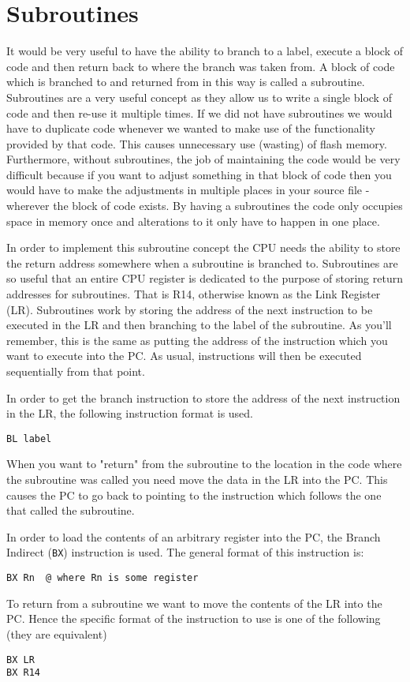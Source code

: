 \chapter{Subroutines}
It would be very useful to have the ability to branch to a label, execute a block of code and then return back to where the branch was taken from. A block of code which is branched to and returned from in this way is called a subroutine.
Subroutines are a very useful concept as they allow us to write a single block of code and then re-use it multiple times. 
If we did not have subroutines we would have to duplicate code whenever we wanted to make use of the functionality provided by that code.
This causes unnecessary use (wasting) of flash memory.
Furthermore, without subroutines, the job of maintaining the code would be very difficult because if you want to adjust something in that block of code then you would have to make the adjustments in multiple places in your source file - wherever the block of code exists.
By having a subroutines the code only occupies space in memory once and alterations to it only have to happen in one place.

In order to implement this subroutine concept the CPU needs the ability to store the return address somewhere when a subroutine is branched to. 
Subroutines are so useful that an entire CPU register is dedicated to the purpose of storing return addresses for subroutines. That is R14, otherwise known as the Link Register (LR).
Subroutines work by storing the address of the next instruction to be executed in the LR and then branching to the label of the subroutine.
As you'll remember, this is the same as putting the address of the instruction which you want to execute into the PC. As usual, instructions will then be executed sequentially from that point.

In order to get the branch instruction to store the address of the next instruction in the LR, the following instruction format is used.
\begin{lstlisting}[fontadjust=true,frame=trBL]
BL label

\end{lstlisting}

When you want to "return" from the subroutine to the location in the code where the subroutine was called you need move the data in the LR into the PC. This causes the PC to go back to pointing to the instruction which follows the one that called the subroutine. 

In order to load the contents of an arbitrary register into the PC, the Branch Indirect (\texttt{BX}) instruction is used.
The general format of this instruction is:
\begin{lstlisting}[fontadjust=true,frame=trBL]
BX Rn  @ where Rn is some register
\end{lstlisting}

To return from a subroutine we want to move the contents of the LR into the PC. Hence the specific format of the instruction to use is one of the following (they are equivalent) 
\begin{lstlisting}[fontadjust=true,frame=trBL]
BX LR
BX R14
\end{lstlisting}
